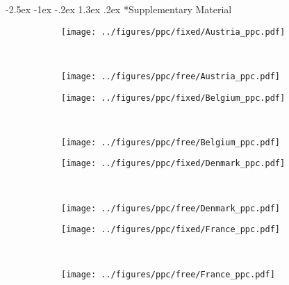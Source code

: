 \documentclass[12pt]{extarticle}
\makeatletter
\renewcommand\section{\@startsection {section}{1}{\z@}%
     {-2.5ex \@plus -1ex \@minus -.2ex}%
     {1.3ex \@plus.2ex}%
    {\Large\bfseries}}
\newcommand{\beginsupplement}{%
      	\setcounter{table}{0}
        \renewcommand{\thetable}{S\arabic{table}}%
        \setcounter{figure}{0}
        \renewcommand{\thefigure}{S\arabic{figure}}%
}
\makeatother
\begin{document}
\pagebreak
\section*{Supplementary Material}
\beginsupplement %



\begin{figure}[h]	
    \centering
    \begin{subfigure}{0.45\textwidth}
        \texttt{[image: ../figures/ppc/fixed/Austria\_ppc.pdf]}
    \end{subfigure}
    \label{fig:ppc}
    ~
    \begin{subfigure}{0.45\textwidth}
        \texttt{[image: ../figures/ppc/free/Austria\_ppc.pdf]}
    \end{subfigure}
    \begin{subfigure}{0.45\textwidth}
        \texttt{[image: ../figures/ppc/fixed/Belgium\_ppc.pdf]}
    \end{subfigure}
    ~
    \begin{subfigure}{0.45\textwidth}
        \texttt{[image: ../figures/ppc/free/Belgium\_ppc.pdf]}
    \end{subfigure}
     \begin{subfigure}{0.45\textwidth}
        \texttt{[image: ../figures/ppc/fixed/Denmark\_ppc.pdf]}
    \end{subfigure}
    ~
    \begin{subfigure}{0.45\textwidth}
        \texttt{[image: ../figures/ppc/free/Denmark\_ppc.pdf]}
    \end{subfigure}
    \begin{subfigure}{0.45\textwidth}
        \texttt{[image: ../figures/ppc/fixed/France\_ppc.pdf]}
    \end{subfigure}
    ~
    \begin{subfigure}{0.45\textwidth}
        \texttt{[image: ../figures/ppc/free/France\_ppc.pdf]}
    \end{subfigure}
\end{figure}
\end{document}
